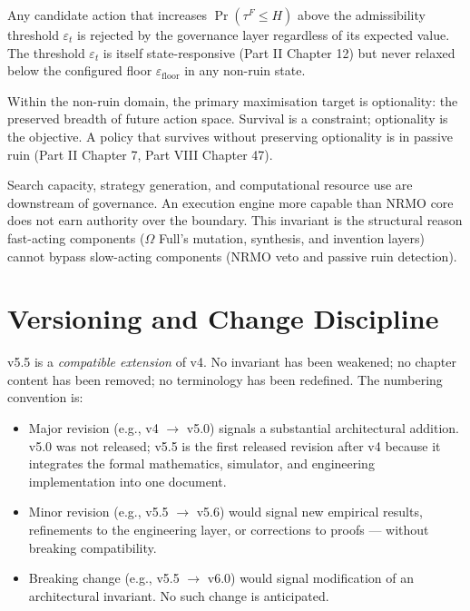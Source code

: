 \begin{invariant}
\label{inv:true-ruin-hard}
Any candidate action that increases $\Pr(\tau^F \le H)$ above the
admissibility threshold $\varepsilon_t$ is rejected by the governance
layer regardless of its expected value. The threshold $\varepsilon_t$
is itself state-responsive (Part II Chapter 12) but never relaxed below
the configured floor $\varepsilon_{\mathrm{floor}}$ in any non-ruin
state.
\end{invariant}

\begin{invariant}
\label{inv:optionality}
Within the non-ruin domain, the primary maximisation target is
optionality: the preserved breadth of future action space. Survival is
a constraint; optionality is the objective. A policy that survives
without preserving optionality is in passive ruin
(Part II Chapter 7, Part VIII Chapter 47).
\end{invariant}

\begin{invariant}
\label{inv:intelligence-not-authority}
Search capacity, strategy generation, and computational resource use
are downstream of governance. An execution engine more capable than
NRMO core does not earn authority over the boundary. This invariant is
the structural reason fast-acting components ($\Omega$ Full's mutation,
synthesis, and invention layers) cannot bypass slow-acting components
(NRMO veto and passive ruin detection).
\end{invariant}

\section*{Versioning and Change Discipline}

\noindent
v5.5 is a \emph{compatible extension} of v4. No invariant has been
weakened; no chapter content has been removed; no terminology has been
redefined. The numbering convention is:

\begin{itemize}
\item Major revision (e.g., v4 $\to$ v5.0) signals a substantial
  architectural addition. v5.0 was not released; v5.5 is the first
  released revision after v4 because it integrates the formal
  mathematics, simulator, and engineering implementation into one
  document.
\item Minor revision (e.g., v5.5 $\to$ v5.6) would signal new empirical
  results, refinements to the engineering layer, or corrections to
  proofs --- without breaking compatibility.
\item Breaking change (e.g., v5.5 $\to$ v6.0) would signal modification
  of an architectural invariant. No such change is anticipated.
\end{itemize}

